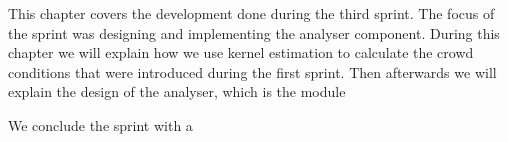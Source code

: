 This chapter covers the development done during the third sprint. The focus of the sprint was designing and implementing the analyser component. During this chapter we will explain how we use kernel estimation to calculate the crowd conditions that were introduced during the first sprint. Then afterwards we will explain the design of the analyser, which is the module 

We conclude the sprint with a 